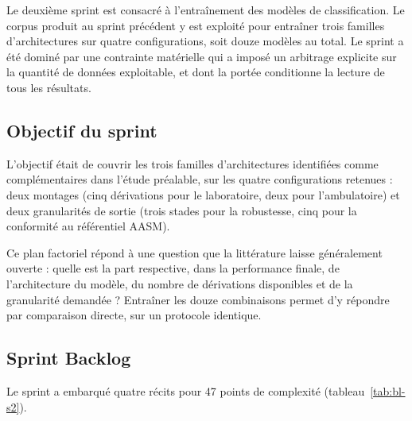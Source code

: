 Le deuxième sprint est consacré à l'entraînement des modèles de classification. Le corpus
produit au sprint précédent y est exploité pour entraîner trois familles d'architectures sur
quatre configurations, soit douze modèles au total. Le sprint a été dominé par une contrainte
matérielle qui a imposé un arbitrage explicite sur la quantité de données exploitable, et
dont la portée conditionne la lecture de tous les résultats.

\subsection{Objectif du sprint}

L'objectif était de couvrir les trois familles d'architectures identifiées
comme complémentaires dans l'étude préalable, sur les quatre configurations
retenues : deux montages (cinq dérivations pour le laboratoire, deux pour
l'ambulatoire) et deux granularités de sortie (trois stades pour la robustesse,
cinq pour la conformité au référentiel AASM).

Ce plan factoriel répond à une question que la littérature laisse
généralement ouverte : quelle est la part respective, dans la performance finale, de
l'architecture du modèle, du nombre de dérivations disponibles et de la granularité
demandée ? Entraîner les douze combinaisons permet d'y répondre par comparaison directe,
sur un protocole identique.

\subsection{Sprint Backlog}

Le sprint a embarqué quatre récits pour 47 points de complexité
(tableau~\ref{tab:bl-s2}).

